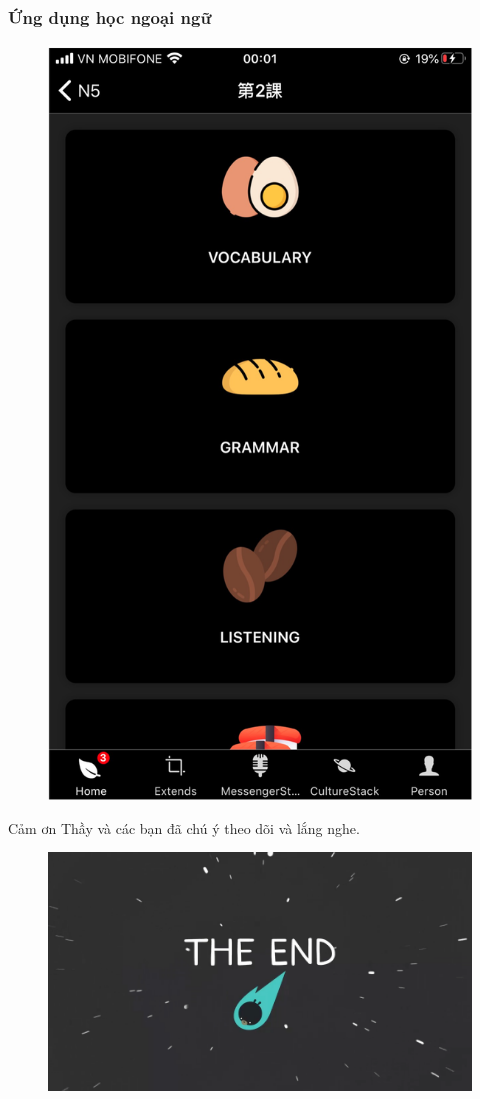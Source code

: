 \documentclass{beamer}
\begin{document}
\begin{frame}
\frametitle{Ứng dụng học ngoại ngữ}

\begin{figure}[h]
	\centering
	\includegraphics[width=.35\textwidth]{demo-8}
\end{figure}

\end{frame}


\begin{frame}

\centering
Cảm ơn Thầy và các bạn đã chú ý theo dõi và lắng nghe.

\begin{figure}[h]
	\vspace{5pt}
	\centering
	\includegraphics[width=.9\textwidth]{the-end-6}
\end{figure}
	
\end{frame}
\end{document}
